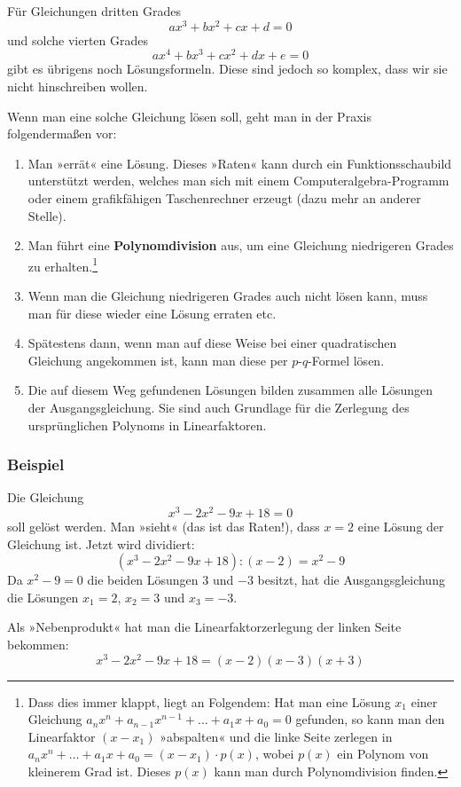 Für Gleichungen dritten Grades
\[ ax^3 + bx^2 + cx + d = 0 \]
und solche vierten Grades
\[ ax^4 + bx^3 + cx^2 + dx + e = 0 \]
gibt es übrigens noch Lösungsformeln. Diese sind jedoch so komplex, dass wir sie nicht hinschreiben wollen.

Wenn man eine solche Gleichung lösen soll, geht man in der Praxis folgendermaßen vor:
\begin{enumerate}
  \item Man »errät« eine Lösung. Dieses »Raten« kann durch ein Funktionsschaubild unterstützt werden, welches man sich mit einem Computeralgebra-Programm oder einem grafikfähigen Taschenrechner erzeugt (dazu mehr an anderer Stelle).
  \item Man führt eine \textbf{Polynomdivision} aus, um eine Gleichung niedrigeren Grades zu erhalten.\footnote{Dass dies immer klappt, liegt an Folgendem: Hat man eine Lösung $x_1$ einer Gleichung $a_n x^n + a_{n-1} x^{n-1} + \ldots + a_1 x + a_0 = 0$ gefunden, so kann man den Linearfaktor $(x - x_1)$ »abspalten« und die linke Seite zerlegen in $a_n x^n + \ldots + a_1 x + a_0 = (x - x_1) \cdot p(x)$, wobei $p(x)$ ein Polynom von kleinerem Grad ist. Dieses $p(x)$ kann man durch Polynomdivision finden.}
  \item Wenn man die Gleichung niedrigeren Grades auch nicht lösen kann, muss man für diese wieder eine Lösung erraten etc.
  \item Spätestens dann, wenn man auf diese Weise bei einer quadratischen Gleichung angekommen ist, kann man diese per $p$-$q$-Formel lösen.
  \item Die auf diesem Weg gefundenen Lösungen bilden zusammen alle Lösungen der Ausgangsgleichung. Sie sind auch Grundlage für die Zerlegung des ursprünglichen Polynoms in Linearfaktoren.
\end{enumerate}

\subsubsection{Beispiel}

Die Gleichung
\[ x^3 - 2x^2 - 9x + 18 = 0 \]
soll gelöst werden. Man »sieht« (das ist das Raten!), dass $x = 2$ eine Lösung der Gleichung ist. Jetzt wird dividiert:
\[ (x^3 - 2x^2 - 9x + 18) : (x - 2) = x^2 - 9 \]
Da $x^2 - 9 = 0$ die beiden Lösungen 3 und $-3$ besitzt, hat die Ausgangsgleichung die Lösungen $x_1 = 2$, $x_2 = 3$ und $x_3 = -3$.

Als »Nebenprodukt« hat man die Linearfaktorzerlegung der linken Seite bekommen:
\[ x^3 - 2x^2 - 9x + 18 = (x-2)(x-3)(x+3)\]\beispielende

